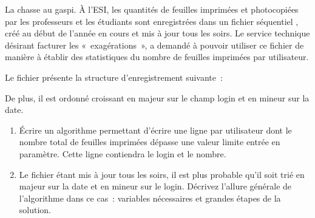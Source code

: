 \begin{Exercice}{La chasse au gaspi.}
	À l’ESI, les quantités de feuilles imprimées et photocopiées par les
	professeurs et les étudiants sont enregistrées dans un fichier
	séquentiel , créé au début de l’année en cours et mis à jour
	tous les soirs. Le service technique désirant facturer les
	«~exagérations~», a demandé à pouvoir utiliser ce fichier de manière à
	établir des statistiques du nombre de feuilles imprimées par
	utilisateur.

	Le fichier  présente la structure d’enregistrement
	 suivante~:
	

	De plus, il est ordonné croissant en majeur sur le champ login et en
	mineur sur la date. 

	\begin{enumerate}[label=\alph*)]
		\item 
			Écrire un algorithme permettant d'écrire une ligne par
			utilisateur dont le nombre total de feuilles imprimées dépasse une
			valeur limite entrée en paramètre. Cette ligne contiendra le login et
			le nombre.
		\item 
			Le fichier étant mis à jour tous les soirs, il est plus probable
			qu'il soit trié en majeur sur la date et en mineur sur
			le login. Décrivez l'allure générale de
			l'algorithme dans ce cas~: variables nécessaires et
			grandes étapes de la solution.
	\end{enumerate}
\end{Exercice}
	
